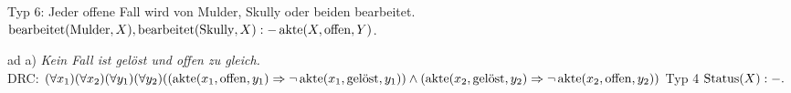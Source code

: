 \documentclass[12pt,a4paper]{amsart}
\begin{document}
Typ 6: Jeder offene Fall wird von Mulder, Skully oder beiden bearbeitet. \\
$\operatorname{bearbeitet}(\operatorname{Mulder},X),\operatorname{bearbeitet}(\operatorname{Skully},X):-\operatorname{akte}(X,\operatorname{offen},Y)$.





\bigskip

\begin{aufgabe1}

\end{aufgabe1}

ad a) {\em Kein Fall ist gelöst und offen zu gleich.} \\
DRC: $(\forall x_1)(\forall x_2)(\forall y_1)(\forall y_2)((\operatorname{akte}(x_1,\operatorname{offen},y_1)\Rightarrow\lnot\operatorname{akte}(x_1,\operatorname{gel\ddot{o}st},y_1))\land
(\operatorname{akte}(x_2,\operatorname{gel\ddot{o}st},y_2)\Rightarrow\lnot\operatorname{akte}(x_2,\operatorname{offen},y_2))$
Typ 4 $\operatorname{Status}(X):-.$
\end{document}
